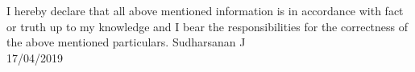 \documentclass[letterpaper]{twentysecondcv} %
\begin{document}
\profilesection{\color{black}{Declaration}}
\begin{flushleft}
	\Large I hereby declare that all above mentioned information is in accordance with fact or truth up to my knowledge and I bear the responsibilities for the correctness of the above mentioned particulars.\newline\newline\newline
Sudharsanan J\\
17/04/2019
\end{flushleft}
\end{document}
